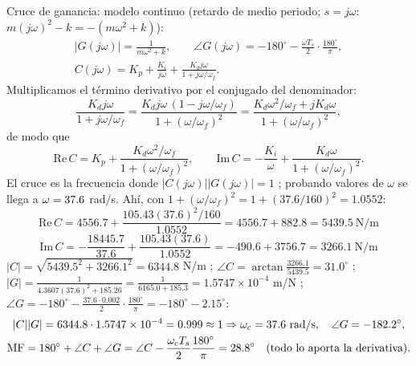 \documentclass[11pt,a4paper]{article}
\makeatletter
\numberwithin{equation}{section}
\renewcommand\paragraph{\@startsection{paragraph}{4}{\z@}{1.4ex plus .4ex}{-0.6em}%
  {\normalfont\color{tinta}}}
\makeatother
\begin{document}
\paragraph{Cruce de ganancia:} modelo continuo (retardo de medio periodo; $s = j\omega$: $m(j\omega)^2 - k = -(m\omega^2 + k)$):
\begin{gather*}
|G(j\omega)| = \frac{1}{m\omega^2 + k},\qquad \angle G(j\omega) = -180^\circ - \frac{\omega T_s}{2}\cdot\frac{180^\circ}{\pi},\\
C(j\omega) = K_p + \frac{K_i}{j\omega} + \frac{K_dj\omega}{1 + j\omega/\omega_f}.
\end{gather*}
Multiplicamos el término derivativo por el conjugado del denominador:
\begin{equation*}
\frac{K_dj\omega}{1 + j\omega/\omega_f} = \frac{K_dj\omega\,(1 - j\omega/\omega_f)}{1 + (\omega/\omega_f)^2} = \frac{K_d\omega^2/\omega_f + jK_d\omega}{1 + (\omega/\omega_f)^2},
\end{equation*}
de modo que
\begin{equation*}
\mathrm{Re}\,C = K_p + \frac{K_d\omega^2/\omega_f}{1 + (\omega/\omega_f)^2},\qquad \mathrm{Im}\,C = -\frac{K_i}{\omega} + \frac{K_d\omega}{1 + (\omega/\omega_f)^2}.
\end{equation*}
El cruce es la frecuencia donde $|C(j\omega)||G(j\omega)| = 1$ ; probando valores de $\omega$ se llega a $\omega = 37.6$ rad/s. Ahí, con $1 + (\omega/\omega_f)^2 = 1 + (37.6/160)^2 = 1.0552$:
\[
\mathrm{Re}\,C = 4556.7 + \frac{105.43(37.6)^2/160}{1.0552} = 4556.7 + 882.8 = 5439.5\ \text{N/m}
\]
\[
\mathrm{Im}\,C = -\frac{18445.7}{37.6} + \frac{105.43(37.6)}{1.0552} = -490.6 + 3756.7 = 3266.1\ \text{N/m}
\]
$|C| = \sqrt{5439.5^2 + 3266.1^2} = 6344.8$ N/m ; $\angle C = \arctan\frac{3266.1}{5439.5} = 31.0^\circ$ ; $|G| = \frac{1}{4.3607(37.6)^2 + 185.26} = \frac{1}{6165.0 + 185.3} = 1.5747\times10^{-4}$ m/N ; $\angle G = -180^\circ - \frac{37.6\cdot0.002}{2}\cdot\frac{180^\circ}{\pi} = -180^\circ - 2.15^\circ$:
\begin{gather*}
|C||G| = 6344.8\cdot1.5747\times10^{-4} = 0.999 \approx 1 \Rightarrow \omega_c = 37.6\ \text{rad/s},\quad \angle G = -182.2^\circ, \\
\mathrm{MF} = 180^\circ + \angle C + \angle G = \angle C - \frac{\omega_cT_s}{2}\frac{180^\circ}{\pi} = 28.8^\circ\quad(\text{todo lo aporta la derivativa}).
\end{gather*}
\end{document}

